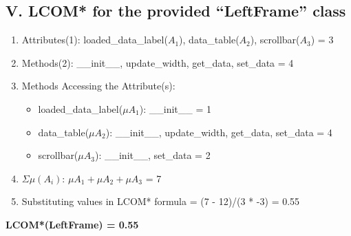 \documentclass[english,12pt,a4paper]{report}
\begin{document}
	\subsection*{V. LCOM* for the provided ``LeftFrame'' class}
	\begin{enumerate}[label=\arabic*.]
		\item Attributes(1): loaded\_data\_label(\(A_1\)), data\_table(\(A_2\)), scrollbar(\(A_3\)) = 3
		\item Methods(2): \_\_init\_\_, update\_width, get\_data, set\_data = 4
		\item Methods Accessing the Attribute(s):
		\begin{itemize}[label={$\bullet$}]
			\item loaded\_data\_label(\(\mu A_1\)): \_\_init\_\_ = 1
			\item data\_table(\(\mu A_2\)): \_\_init\_\_, update\_width, get\_data, set\_data = 4
			\item scrollbar(\(\mu A_3\)): \_\_init\_\_, set\_data = 2
		\end{itemize}
		\item \(\Sigma\mu(A_i)\): \(\mu A_1 + \mu A_2 + \mu A_3\) = 7
		\item Substituting values in LCOM* formula = (7 - 12)/(3 * -3) = 0.55
	\end{enumerate}
	\textbf{LCOM*(LeftFrame) = 0.55}
	
\end{document}
